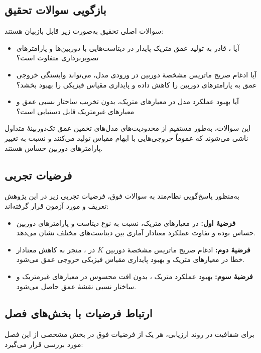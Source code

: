 \subsection{بازگویی سوالات تحقیق}
سوالات اصلی تحقیق به‌صورت زیر قابل بازبیان هستند:

\begin{itemize}
    \item آیا \basemodel{}،
    قادر به تولید عمق متریک پایدار در دیتاست‌هایی با دوربین‌ها
    و پارامترهای تصویربرداری متفاوت است؟
    
    \item آیا ادغام صریح ماتریس مشخصهٔ دوربین
    در ورودی مدل، می‌تواند وابستگی خروجی عمق به پارامترهای دوربین
    را کاهش داده و پایداری مقیاس فیزیکی را بهبود بخشد؟
    
    \item آیا بهبود عملکرد مدل در معیارهای متریک،
    بدون تخریب ساختار نسبی عمق و معیارهای غیرمتریک
    قابل دستیابی است؟
\end{itemize}

این سوالات، به‌طور مستقیم از محدودیت‌های مدل‌های
تخمین عمق تک‌دوربینهٔ متداول ناشی می‌شوند
که عموماً خروجی‌هایی با ابهام مقیاس
تولید می‌کنند و نسبت به تغییر پارامترهای دوربین حساس هستند.

\subsection{فرضیات تجربی}
به‌منظور پاسخ‌گویی نظام‌مند به سوالات فوق،
فرضیات تجربی زیر در این پژوهش تعریف و مورد آزمون قرار گرفته‌اند:

\begin{itemize}
    \item \textbf{فرضیهٔ اول:}
    \basemodel{} در معیارهای متریک،
    نسبت به نوع دیتاست و پارامترهای دوربین حساس بوده
    و تفاوت عملکرد معنادار آماری بین دیتاست‌های مختلف نشان می‌دهد.
    
    \item \textbf{فرضیهٔ دوم:}
    ادغام صریح ماتریس مشخصهٔ دوربین $K$ در \proposedmodel{}،
    منجر به کاهش معنادار خطا در معیارهای متریک
    و بهبود پایداری مقیاس فیزیکی خروجی عمق می‌شود.
    
    \item \textbf{فرضیهٔ سوم:}
    بهبود عملکرد متریک \proposedmodel{}،
    بدون افت محسوس در معیارهای غیرمتریک
    و ساختار نسبی نقشهٔ عمق حاصل می‌شود.
\end{itemize}

\subsection{ارتباط فرضیات با بخش‌های فصل}
برای شفافیت در روند ارزیابی، هر یک از فرضیات فوق
در بخش مشخصی از این فصل مورد بررسی قرار می‌گیرد:

